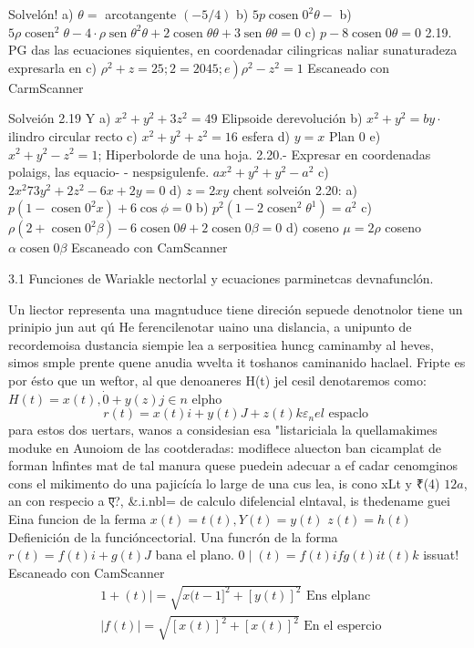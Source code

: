 Solvelón! a) $\theta=$ arcotangente $(-5 / 4)$ b) $5 p \operatorname{cosen} 0^2 \theta-$
b) $5 \rho \operatorname{cosen}^2 \theta-4 \cdot \rho \operatorname{sen} \theta^2 \theta+2 \operatorname{cosen} \theta \theta+3 \operatorname{sen} \theta \theta=0$
c) $p-8 \operatorname{cosen} 0 \theta=0$
2.19. PG das las ecuaciones siquientes, en coordenadar cilingricas naliar sunaturadeza expresarla en c) $\left.\rho^2+z=25 ; \mathcal{2}=2045 ; e\right) \rho^2-z^2=1$
Escaneado con CarmScanner




Solveión 2.19
Y a) $x^2+y^2+3 z^2=49$ Elipsoide derevolución
b) $x^2+y^2=b y \cdot$ ilindro circular recto
c) $x^2+y^2+z^2=16$ esfera
d) $y=x$ Plan 0
e) $x^2+y^2-z^2=1$; Hiperbolorde de una hoja.
2.20.- Expresar en coordenadas polaigs, las equacio-
- nespsigulenfe. $a x^2+y^2+y^2-a^2$
c) $2 x^2 73 y^2+2 z^2-6 x+2 y=0$ d) $z=2 x y$
chent
solveión 2.20:
a) $p\left(1-\operatorname{cosen} 0^2 x\right)+6 \cos \phi=0$
b) $p^2\left(1-2 \operatorname{cosen}^2 \theta^1\right)=a^2$
c) $\rho\left(2+\operatorname{cosen} 0^2 \beta\right)-6 \operatorname{cosen} 0 \theta+2 \operatorname{cosen} 0 \beta=0$
d) coseno $\mu=2 \rho$ coseno $\alpha \operatorname{cosen} 0 \beta$
Escaneado con CamScanner




3.1 Funciones de Wariakle nectorlal y ecuaciones parminetcas devnafunclón.

Un liector representa una magntuduce tiene direción sepuede denotnolor tiene un prinipio jun aut qú He ferencilenotar uaino una dislancia, a unipunto de recordemoisa dustancia siempie lea a serpositiea huncg caminamby al heves, simos smple prente quene anudia wvelta it toshanos caminanido haclael. Fripte es por ésto que un weftor, al que denoaneres H(t) jel cesil denotaremos como:
$H(t)=x(t), \dot{0}+y(z) j \in n$ elpho
$$
r(t)=x(t) i+y(t) J+z(t) k \varepsilon_n e l \text { espaclo }
$$
para estos dos uertars, wanos a considesian esa
"listariciala la quellamakimes moduke en Aunoiom de las cootderadas:
modiflece aluecton ban cicamplat de forman lnfintes mat de tal manura quese puedein adecuar a ef cadar cenomginos cons el mikimento do una pajicícía lo large de una cus lea, is cono xLt y ₹(4) $12 a$, an con respecio a ए?, \&.i.nbl= de calculo difelencial elntaval, is thedename
guei Eina funcion de la ferma $x(t)=t(t), Y(t)=y(t)$
$z(t)=h(t)$
Defienición de la funcióncectorial.
Una funcrón de la forma
$r(t)=f(t) i+g(t) J$ bana el plano.
$0 \mid(t)=f(t) i f g(t) i t(t) k$ issuat!
Escaneado con CamScanner
$$
\begin{aligned}
	& 1+(t) \mid=\sqrt{x(t-1]^2+[y(t)]^2} \text { Ens elplanc } \\
	& |f(t)|=\sqrt{[x(t)]^2+[x(t)]^2} \text { En el espercio }
\end{aligned}
$$


